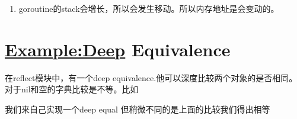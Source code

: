 \begin{enumerate}
\begin{Shaded}
\begin{Highlighting}[]
\NormalTok{ (Value) InterfaceData() [}\NormalTok{]} 
\end{Highlighting}
\end{Shaded}
\item
  goroutine的stack会增长，所以会发生移动。所以内存地址是会变动的。
\end{enumerate}

\hypertarget{exampledeep-equivalence}{%
\section{\texorpdfstring{\url{Example:Deep}
Equivalence}{Example:Deep Equivalence}}\label{exampledeep-equivalence}}

在reflect模块中，有一个deep
equivalence.他可以深度比较两个对象的是否相同。对于nil和空的字典比较是不等。比如

\begin{Shaded}
\begin{Highlighting}[]
\NormalTok{ = }\NormalTok{, []}\NormalTok{\{\}}
\NormalTok{[}\NormalTok{]}\NormalTok{ = }\NormalTok{, }\NormalTok{(}\NormalTok{[}\NormalTok{]}\NormalTok{)}
\end{Highlighting}
\end{Shaded}

我们来自己实现一个deep equal 但稍微不同的是上面的比较我们得出相等

